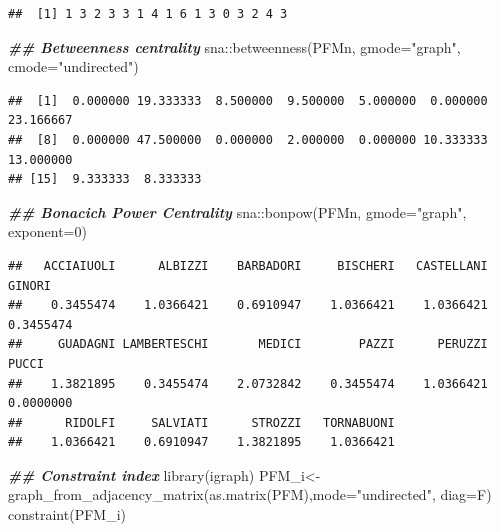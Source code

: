\documentclass[
  notitlepage,
  onecolumn,
  openany]{book}
\newenvironment{Shaded}{\begin{snugshade}}{\end{snugshade}}
\newcommand{\AttributeTok}[1]{\textcolor[rgb]{0.77,0.63,0.00}{#1}}
\newcommand{\DecValTok}[1]{\textcolor[rgb]{0.00,0.00,0.81}{#1}}
\newcommand{\DocumentationTok}[1]{\textcolor[rgb]{0.56,0.35,0.01}{\textbf{\textit{#1}}}}
\newcommand{\FunctionTok}[1]{\textcolor[rgb]{0.00,0.00,0.00}{#1}}
\newcommand{\NormalTok}[1]{#1}
\newcommand{\OtherTok}[1]{\textcolor[rgb]{0.56,0.35,0.01}{#1}}
\newcommand{\SpecialCharTok}[1]{\textcolor[rgb]{0.00,0.00,0.00}{#1}}
\newcommand{\StringTok}[1]{\textcolor[rgb]{0.31,0.60,0.02}{#1}}
\begin{document}
\begin{verbatim}
##  [1] 1 3 2 3 3 1 4 1 6 1 3 0 3 2 4 3
\end{verbatim}

\begin{Shaded}
\begin{Highlighting}[]
\DocumentationTok{\#\# Betweenness centrality}
\NormalTok{sna}\SpecialCharTok{::}\FunctionTok{betweenness}\NormalTok{(PFMn, }\AttributeTok{gmode=}\StringTok{"graph"}\NormalTok{, }\AttributeTok{cmode=}\StringTok{"undirected"}\NormalTok{)}
\end{Highlighting}
\end{Shaded}

\begin{verbatim}
##  [1]  0.000000 19.333333  8.500000  9.500000  5.000000  0.000000 23.166667
##  [8]  0.000000 47.500000  0.000000  2.000000  0.000000 10.333333 13.000000
## [15]  9.333333  8.333333
\end{verbatim}

\begin{Shaded}
\begin{Highlighting}[]
\DocumentationTok{\#\# Bonacich Power Centrality}
\NormalTok{sna}\SpecialCharTok{::}\FunctionTok{bonpow}\NormalTok{(PFMn, }\AttributeTok{gmode=}\StringTok{"graph"}\NormalTok{, }\AttributeTok{exponent=}\DecValTok{0}\NormalTok{)}
\end{Highlighting}
\end{Shaded}

\begin{verbatim}
##   ACCIAIUOLI      ALBIZZI    BARBADORI     BISCHERI   CASTELLANI       GINORI 
##    0.3455474    1.0366421    0.6910947    1.0366421    1.0366421    0.3455474 
##     GUADAGNI LAMBERTESCHI       MEDICI        PAZZI      PERUZZI        PUCCI 
##    1.3821895    0.3455474    2.0732842    0.3455474    1.0366421    0.0000000 
##      RIDOLFI     SALVIATI      STROZZI   TORNABUONI 
##    1.0366421    0.6910947    1.3821895    1.0366421
\end{verbatim}

\begin{Shaded}
\begin{Highlighting}[]
\DocumentationTok{\#\# Constraint index}
\FunctionTok{library}\NormalTok{(igraph)}
\NormalTok{PFM\_i}\OtherTok{\textless{}{-}}\FunctionTok{graph\_from\_adjacency\_matrix}\NormalTok{(}\FunctionTok{as.matrix}\NormalTok{(PFM),}\AttributeTok{mode=}\StringTok{"undirected"}\NormalTok{, }\AttributeTok{diag=}\NormalTok{F)}
\FunctionTok{constraint}\NormalTok{(PFM\_i)}
\end{Highlighting}
\end{Shaded}
\end{document}
